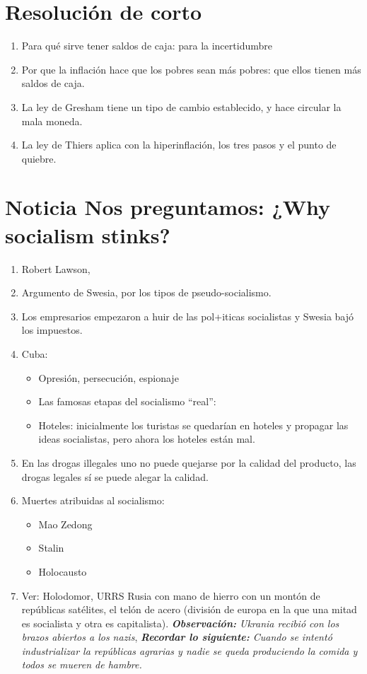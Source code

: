 \section{Resolución de corto}   
\begin{enumerate}
    \item Para qué sirve tener saldos de caja: para la incertidumbre
    \item Por que la inflación hace que los pobres sean más pobres:  que ellos tienen más saldos de caja.
    \item La ley de Gresham tiene un tipo de cambio establecido, y hace circular la mala moneda.
    \item La ley de Thiers aplica con la hiperinflación, los tres pasos y el punto de quiebre.
\end{enumerate}

\section{Noticia \textbf{Nos preguntamos:} ¿Why socialism stinks?}
\begin{enumerate}
    \item Robert Lawson, 
    \item Argumento de Swesia, por los tipos de pseudo-socialismo.
    \item Los empresarios empezaron a huir de las pol+iticas socialistas y Swesia bajó los impuestos.
    \item Cuba: 
    \begin{itemize}
        \item Opresión, persecución, espionaje 
        \item Las famosas etapas del socialismo ``real'':      
        \item Hoteles: inicialmente los turistas se quedarían en hoteles y propagar las ideas socialistas, pero ahora los hoteles están mal.
    \end{itemize}

    \item En las drogas illegales uno no puede quejarse por la calidad del producto, las drogas legales sí se puede alegar la calidad.
    \item Muertes atribuidas al socialismo:
        \begin{itemize}
            \item Mao Zedong
            \item Stalin 
            \item Holocausto
        \end{itemize}
    \item Ver: Holodomor, URRS Rusia con mano de hierro con un montón de repúblicas satélites, el telón de acero (división de europa en la que una mitad es socialista y otra es capitalista). \emph{\textbf{Observación: }Ukrania recibió con los brazos abiertos a los nazis}, \emph{\textbf{Recordar lo siguiente: }Cuando se intentó industrializar la repúblicas agrarias y nadie se queda produciendo la comida y todos se mueren de hambre.}
\end{enumerate}

